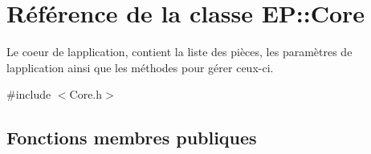 \hypertarget{class_e_p_1_1_core}{}\section{Référence de la classe EP\+:\+:Core}
\label{class_e_p_1_1_core}


Le coeur de l\textquotesingle{}application, contient la liste des pièces, les paramètres de l\textquotesingle{}application ainsi que les méthodes pour gérer ceux-\/ci.  




{\ttfamily \#include $<$Core.\+h$>$}

\subsection*{Fonctions membres publiques}
